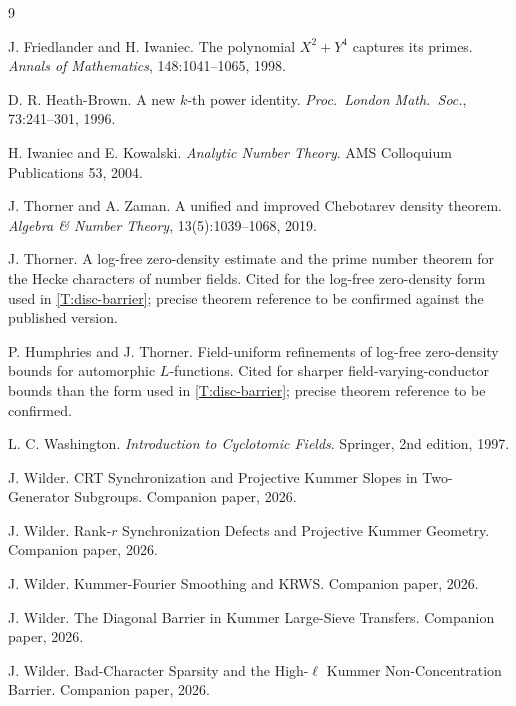 \documentclass[11pt]{article}
\newcommand{\1}{\mathbf 1}
\begin{document}

\begin{thebibliography}{9}

J. Friedlander and H. Iwaniec.
\newblock The polynomial \(X^2+Y^4\) captures its primes.
\newblock \emph{Annals of Mathematics}, 148:1041--1065, 1998.

D. R. Heath-Brown.
\newblock A new \(k\)-th power identity.
\newblock \emph{Proc.\ London Math.\ Soc.}, 73:241--301, 1996.

H. Iwaniec and E. Kowalski.
\newblock \emph{Analytic Number Theory}.
\newblock AMS Colloquium Publications 53, 2004.

J. Thorner and A. Zaman.
\newblock A unified and improved Chebotarev density theorem.
\newblock \emph{Algebra \& Number Theory}, 13(5):1039--1068, 2019.

J. Thorner.
\newblock A log-free zero-density estimate and the prime number theorem for the Hecke characters of number fields.
\newblock Cited for the log-free zero-density form used in \cref{T:disc-barrier}; precise theorem reference to be confirmed against the published version.

P. Humphries and J. Thorner.
\newblock Field-uniform refinements of log-free zero-density bounds for automorphic \(L\)-functions.
\newblock Cited for sharper field-varying-conductor bounds than the form used in \cref{T:disc-barrier}; precise theorem reference to be confirmed.

L. C. Washington.
\newblock \emph{Introduction to Cyclotomic Fields}.
\newblock Springer, 2nd edition, 1997.

J. Wilder.
\newblock CRT Synchronization and Projective Kummer Slopes in Two-Generator Subgroups.
\newblock Companion paper, 2026.

J. Wilder.
\newblock Rank-\(r\) Synchronization Defects and Projective Kummer Geometry.
\newblock Companion paper, 2026.

J. Wilder.
\newblock Kummer-Fourier Smoothing and KRWS.
\newblock Companion paper, 2026.

J. Wilder.
\newblock The Diagonal Barrier in Kummer Large-Sieve Transfers.
\newblock Companion paper, 2026.

J. Wilder.
\newblock Bad-Character Sparsity and the High-\(\ell\) Kummer Non-Concentration Barrier.
\newblock Companion paper, 2026.

\end{thebibliography}
\end{document}
